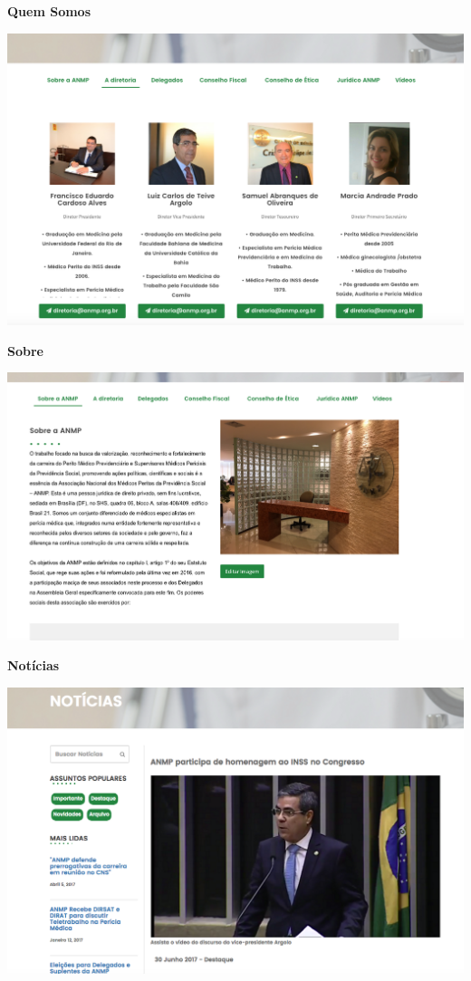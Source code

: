 \textbf{Quem Somos}

\includegraphics[keepaspectratio=true,scale=0.3]{figuras/quem.png}

\textbf{Sobre}

\includegraphics[keepaspectratio=true,scale=0.3]{figuras/sobre.png}

\textbf{Notícias}

\includegraphics[keepaspectratio=true,scale=0.3]{figuras/nots.png}

